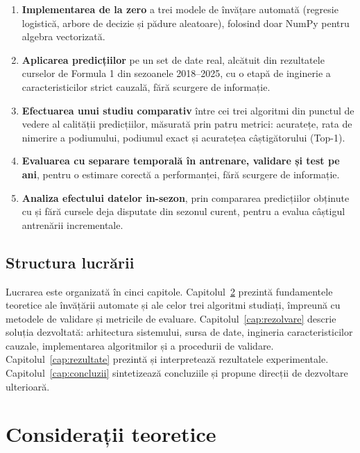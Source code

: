 \documentclass[12pt,a4paper]{report}
\begin{document}
\begin{enumerate}
  \item \textbf{Implementarea de la zero} a trei modele de învățare automată (regresie
    logistică, arbore de decizie și pădure aleatoare), folosind doar NumPy pentru algebra
    vectorizată.
  \item \textbf{Aplicarea predicțiilor} pe un set de date real, alcătuit din rezultatele
    curselor de Formula 1 din sezoanele 2018--2025, cu o etapă de inginerie a
    caracteristicilor strict cauzală, fără scurgere de informație.
  \item \textbf{Efectuarea unui studiu comparativ} între cei trei algoritmi din punctul de
    vedere al calității predicțiilor, măsurată prin patru metrici: acuratețe, rata de nimerire
    a podiumului, podiumul exact și acuratețea câștigătorului (Top-1).
  \item \textbf{Evaluarea cu separare temporală în antrenare, validare și test pe ani},
    pentru o estimare corectă a performanței, fără scurgere de informație.
  \item \textbf{Analiza efectului datelor in-sezon}, prin compararea predicțiilor obținute cu și
    fără cursele deja disputate din sezonul curent, pentru a evalua câștigul antrenării
    incrementale.
\end{enumerate}

\section{Structura lucrării}

Lucrarea este organizată în cinci capitole. Capitolul~\ref{cap:teorie} prezintă fundamentele
teoretice ale învățării automate și ale celor trei algoritmi studiați, împreună cu metodele
de validare și metricile de evaluare. Capitolul~\ref{cap:rezolvare} descrie soluția
dezvoltată: arhitectura sistemului, sursa de date, ingineria caracteristicilor cauzale,
implementarea algoritmilor și a procedurii de validare. Capitolul~\ref{cap:rezultate}
prezintă și interpretează rezultatele experimentale. Capitolul~\ref{cap:concluzii} sintetizează
concluziile și propune direcții de dezvoltare ulterioară.

\chapter{Considerații teoretice}
\label{cap:teorie}
\end{document}
